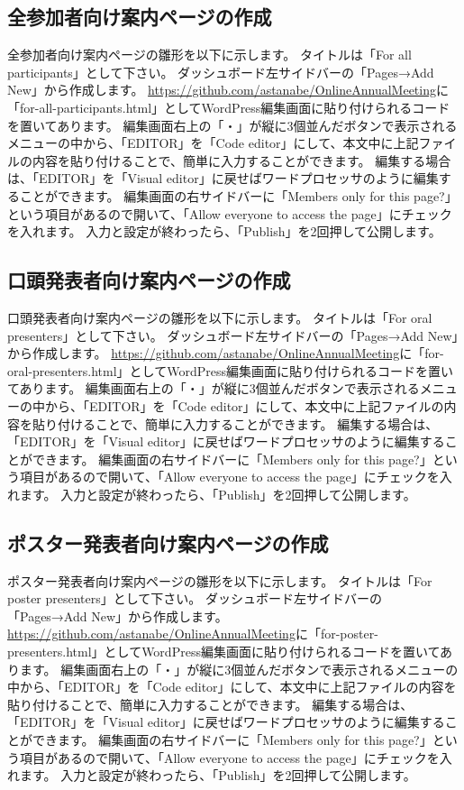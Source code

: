 \documentclass[titlepage,10pt,a4paper,uplatex]{jsbook}
\begin{document}
\subsection{全参加者向け案内ページの作成}

全参加者向け案内ページの雛形を以下に示します。
タイトルは「For all participants」として下さい。
ダッシュボード左サイドバーの「Pages→Add New」から作成します。
\url{https://github.com/astanabe/OnlineAnnualMeeting}に「for-all-participants.html」としてWordPress編集画面に貼り付けられるコードを置いてあります。
編集画面右上の「・」が縦に3個並んだボタンで表示されるメニューの中から、「EDITOR」を「Code editor」にして、本文中に上記ファイルの内容を貼り付けることで、簡単に入力することができます。
編集する場合は、「EDITOR」を「Visual editor」に戻せばワードプロセッサのように編集することができます。
編集画面の右サイドバーに「Members only for this page?」という項目があるので開いて、「Allow everyone to access the page」にチェックを入れます。
入力と設定が終わったら、「Publish」を2回押して公開します。

\subsection{口頭発表者向け案内ページの作成}

口頭発表者向け案内ページの雛形を以下に示します。
タイトルは「For oral presenters」として下さい。
ダッシュボード左サイドバーの「Pages→Add New」から作成します。
\url{https://github.com/astanabe/OnlineAnnualMeeting}に「for-oral-presenters.html」としてWordPress編集画面に貼り付けられるコードを置いてあります。
編集画面右上の「・」が縦に3個並んだボタンで表示されるメニューの中から、「EDITOR」を「Code editor」にして、本文中に上記ファイルの内容を貼り付けることで、簡単に入力することができます。
編集する場合は、「EDITOR」を「Visual editor」に戻せばワードプロセッサのように編集することができます。
編集画面の右サイドバーに「Members only for this page?」という項目があるので開いて、「Allow everyone to access the page」にチェックを入れます。
入力と設定が終わったら、「Publish」を2回押して公開します。

\subsection{ポスター発表者向け案内ページの作成}

ポスター発表者向け案内ページの雛形を以下に示します。
タイトルは「For poster presenters」として下さい。
ダッシュボード左サイドバーの「Pages→Add New」から作成します。
\url{https://github.com/astanabe/OnlineAnnualMeeting}に「for-poster-presenters.html」としてWordPress編集画面に貼り付けられるコードを置いてあります。
編集画面右上の「・」が縦に3個並んだボタンで表示されるメニューの中から、「EDITOR」を「Code editor」にして、本文中に上記ファイルの内容を貼り付けることで、簡単に入力することができます。
編集する場合は、「EDITOR」を「Visual editor」に戻せばワードプロセッサのように編集することができます。
編集画面の右サイドバーに「Members only for this page?」という項目があるので開いて、「Allow everyone to access the page」にチェックを入れます。
入力と設定が終わったら、「Publish」を2回押して公開します。
\end{document}
